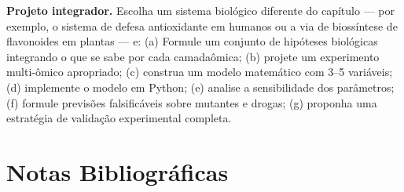 \begin{exercicio}
\textbf{Projeto integrador.} Escolha um sistema biológico diferente do
capítulo --- por exemplo, o sistema de defesa antioxidante em humanos ou a
via de biossíntese de flavonoides em plantas --- e: (a) Formule um conjunto
de hipóteses biológicas integrando o que se sabe por cada camadaômica;
(b) projete um experimento multi-ômico apropriado; (c) construa um modelo
matemático com 3--5 variáveis; (d) implemente o modelo em Python;
(e) analise a sensibilidade dos parâmetros; (f) formule previsões falsificáveis
sobre mutantes e drogas; (g) proponha uma estratégia de validação
experimental completa.
\end{exercicio}

\section{Notas Bibliográficas}
\label{sec:11-bibliografia}

